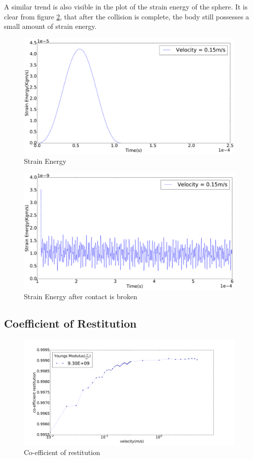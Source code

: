 A similar trend is also visible in the plot of the strain energy of the sphere. It is clear from figure \ref{fig:SEzoomed}, that after the collision is complete, the body still possesses a small amount of strain energy.

\begin{figure}[H]
\includegraphics[width=1.0\textwidth]{../images/StrainEnergy/SE_pdf.pdf}
\caption{Strain Energy}
\label{fig:SE}
\end{figure}
\begin{figure}[H]
\includegraphics[width=1.0\textwidth]{../images/StrainEnergy/SEzoomed_pdf.pdf}
\caption{Strain Energy after contact is broken}
\label{fig:SEzoomed}
\end{figure}


\subsection{Coefficient of Restitution}

\begin{figure}[H]
\includegraphics[scale=0.25]{../images/COR/COR_pdf.pdf}
\caption{Co-efficient of restitution}
\label{fig:COR}
\end{figure}


